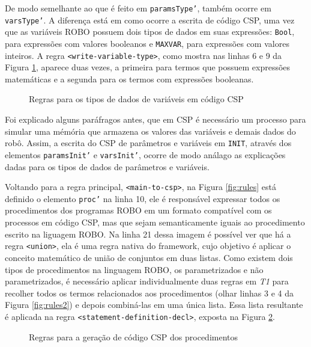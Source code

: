De modo semelhante ao que é feito em \texttt{paramsType'}, também ocorre em \texttt{vars\-Type'}. A diferença está em como ocorre a escrita de código CSP, uma vez que as variáveis ROBO possuem dois tipos de dados em suas expressões: \texttt{Bool}, para expressões com valores booleanos e \texttt{MAXVAR}, para expressões com valores inteiros. A regra \texttt{<write-variable-type>}, como mostra nas linhas 6 e 9 da Figura \ref{fig:rules_var_type}, aparece duas vezes, a primeira para termos que possuem expressões matemáticas e a segunda para os termos com expressões booleanas.

\begin{figure}[h]
\centering
\caption{Regras para os tipos de dados de variáveis em código CSP}

\label{fig:rules_var_type}
\end{figure}

Foi explicado alguns paráfragos antes, que em CSP é necessário um processo para simular uma mémória que armazena os valores das variáveis e demais dados do robô. Assim, a escrita do CSP de parâmetros e variáveis em \texttt{INIT}, através dos elementos \texttt{paramsInit'} e \texttt{varsInit'}, ocorre de modo análago as explicações dadas para os tipos de dados de parâmetros e variáveis.

Voltando para a regra principal, \texttt{<main-to-csp>}, na Figura \ref{fig:rules} está definido o elemento \texttt{proc'} na linha 10, ele é responsável expressar todos os procedimentos dos programas ROBO em um formato compatível com os processos em código CSP, mas que sejam semanticamente iguais ao procedimento escrito na liguagem ROBO. Na linha 21 dessa imagem é possível ver que há a regra \texttt{<union>}, ela é uma regra nativa do framework, cujo objetivo é aplicar o conceito matemático de união de conjuntos em duas listas. Como existem dois tipos de procedimentos na linguagem ROBO, os parametrizados e não parametrizados, é necessário aplicar individualmente duas regras em \textit{T1} para recolher todos os termos relacionados aos procedimentos (olhar linhas 3 e 4 da Figura \ref{fig:rules2}) e depois combiná-las em uma única lista. Essa lista resultante é aplicada na regra \texttt{<statement-definition-decl>}, exposta na Figura \ref{fig:rules_proc}.

\begin{figure}[h]
\centering
\caption{Regras para a geração de código CSP dos procedimentos}

\label{fig:rules_proc}
\end{figure}

